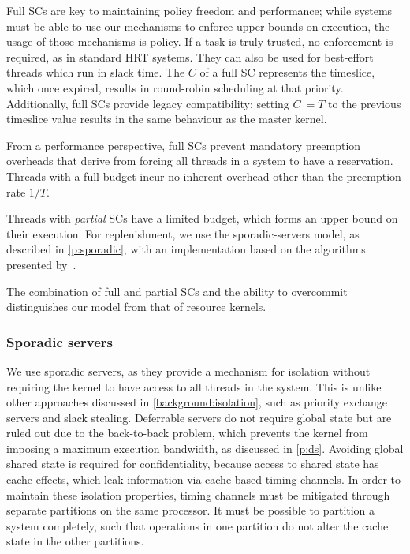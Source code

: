 Full \glspl{SC} are key to maintaining policy freedom and performance; while systems
must be able to use our mechanisms to enforce upper bounds on execution, the usage of 
those mechanisms is policy. If a task is truly trusted, no enforcement is required,
as in standard \gls{HRT} systems. They can also be used for best-effort threads which run in slack time.
The \(C\) of a full \gls{SC} represents the timeslice, which once expired, results in round-robin
scheduling at that priority. Additionally, full \glspl{SC} provide legacy compatibility: setting
\(C\ = T\) to
the previous timeslice value results in the same behaviour as the master kernel. 

From a performance perspective, full \glspl{SC} prevent mandatory preemption overheads 
that derive from forcing all threads in a system to have a reservation. Threads with a full
budget incur no inherent overhead other than the preemption rate $1/T$.

Threads with \emph{partial} \glspl{SC} have a limited budget, which forms an upper
bound on their execution. For replenishment, we
use the sporadic-servers model, as described in \cref{p:sporadic}, with an
implementation based on the algorithms presented
by~\citet{Stanovic_BWH_10}.

The combination of full and partial \glspl{SC}  and the ability to overcommit distinguishes our
model from that of resource kernels.

\subsubsection{Sporadic servers}
\label{sec:model-sporadic}

We use sporadic servers, as they provide a mechanism for isolation without requiring the kernel
to have access to all threads in the system. This is unlike other approaches discussed in
\cref{background:isolation}, such as  priority exchange servers and slack stealing.
Deferrable servers do not require global state but are ruled out due to the back-to-back
problem, which prevents the kernel from imposing a maximum execution bandwidth, as discussed in \cref{p:ds}. Avoiding global shared state is required for confidentiality, because access to shared state
has cache effects, which leak information via cache-based timing-channels. In order to maintain
these isolation properties,
timing channels must be mitigated through separate partitions on the same processor. 
It must be possible to partition a system completely, such that operations in one partition do not
alter the cache state in the other partitions.

